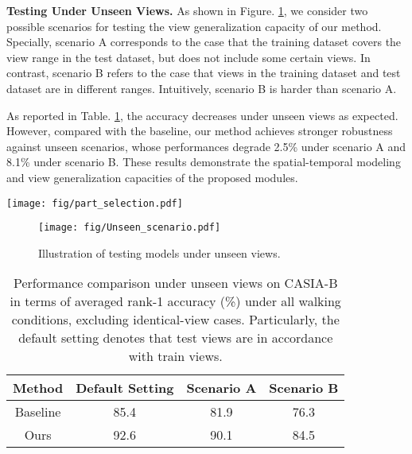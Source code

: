 \documentclass[journal]{IEEEtran}
\begin{document}
\noindent \textbf{Testing Under Unseen Views.} As shown in Figure. \ref{fig:unseen scenarios}, we consider two possible scenarios for testing the view generalization capacity of our method. Specially, scenario A corresponds to the case that the training dataset covers the view range in the test dataset, but does not include some certain views. In contrast, scenario B refers to the case that views in the training dataset and test dataset are in different ranges. Intuitively, scenario B is harder than scenario A.

As reported in Table. \ref{tab:unseen_view}, the accuracy decreases under unseen views as expected. However, compared with the baseline, our method achieves stronger robustness against unseen scenarios, whose performances degrade 2.5\% under scenario A and 8.1\% under scenario B. These results demonstrate the spatial-temporal modeling and view generalization capacities of the proposed modules.

\begin{figure*}[t]
    \centering
    \texttt{[image: fig/part\_selection.pdf]}
    \caption{Illustration of spatial salient feature learning. We select four groups of salient local parts. The red boxes indicate selected parts.}
    \label{fig:part_selection}
\end{figure*}

\begin {figure}[t]
    \centering
    \texttt{[image: fig/Unseen\_scenario.pdf]}
    \caption{Illustration of testing models under unseen views.}
    \label{fig:unseen scenarios}
\end{figure}

\begin{table}[ht]
    \centering
    \caption{Performance comparison under unseen views on CASIA-B in terms of averaged rank-1 accuracy (\%) under all walking conditions, excluding identical-view cases. Particularly, the default setting denotes that test views are in accordance with train views.}
    \begin{tabular}{|c|c|c|c|}
    \hline
Method & Default Setting & Scenario A & Scenario B \\\hline
    Baseline & 85.4 & 81.9 & 76.3 \\\hline 
    Ours & 92.6 & 90.1 & 84.5 \\\hline
    \end{tabular}
    \label{tab:unseen_view}
\end{table}
\end{document}
